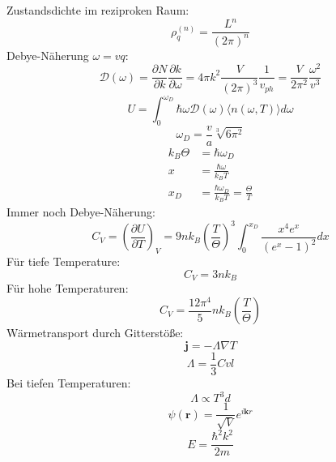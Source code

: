 \documentclass[11pt]{article}
\begin{document}
Zustandsdichte im reziproken Raum:
\begin{equation}
  \rho_q^{(n)}=\frac{L^{n}}{(2\pi)^n}
\end{equation}
Debye-Näherung $\omega=vq$:
\begin{equation}
  \mathcal{D}(\omega)=\frac{\partial N}{\partial k}\frac{\partial k}
  {\partial \omega}=4\pi k^2\frac{V}{(2\pi)^3}\frac{1}{v_{ph}}=
  \frac{V}{2\pi^2}\frac{\omega^2}{v^3}
\end{equation}
\begin{equation}
  U=\int_0^{\omega_D}\hbar\omega\mathcal{D}(\omega)\langle n(\omega,T)\rangle
  d\omega
\end{equation}
\begin{equation}
  \omega_D=\frac{v}{a}\sqrt[3]{6\pi^2}
\end{equation}
\begin{equation}
  \begin{align}
    k_B\Theta&=\hbar\omega_D \\
    x&=\frac{\hbar\omega}{k_BT}\\
    x_D&=\frac{\hbar\omega_D}{k_BT}=\frac{\Theta}{T}
  \end{align}
\end{equation}
Immer noch Debye-Näherung:
\begin{equation}
  C_V=\left(\frac{\partial U}{\partial T}\right)_V=
  9nk_B\left(\frac{T}{\Theta}\right)^3\int_0^{x_D}\frac{x^4e^x}{(e^x-1)^2}dx
\end{equation}
Für tiefe Temperature:
\begin{equation}
  C_V=3nk_B
\end{equation}
Für hohe Temperaturen:
\begin{equation}
  C_V=\frac{12\pi^4}{5}{nk_B}\left(\frac{T}{\Theta}\right)
\end{equation}
Wärmetransport durch Gitterstöße:
\begin{equation}
  \bm{j}=-\Lambda\nabla T
\end{equation}
\begin{equation}
  \Lambda=\frac{1}{3}Cvl
\end{equation}
Bei tiefen Temperaturen:
\begin{equation}
  \Lambda\propto T^3d
\end{equation}
\begin{equation}
  \psi(\bm{r})=\frac{1}{\sqrt{V}}e^{i\bm{k}{r}}
\end{equation}
\begin{equation}
  E=\frac{\hbar^2k^2}{2m}
\end{equation}
\end{document}
